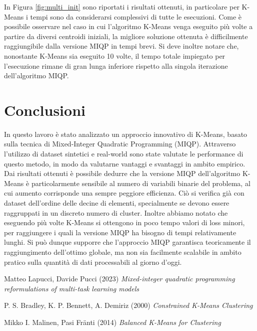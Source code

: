 \documentclass{article}
\begin{document}
    In Figura \ref{fig:multi_init} sono riportati i risultati ottenuti, in particolare per K-Means i tempi sono da considerarsi complessivi di tutte le esecuzioni. Come è possibile osservare nel caso in cui l'algoritmo K-Means venga eseguito più volte a partire da diversi centroidi iniziali, la migliore soluzione ottenuta è difficilmente raggiungibile dalla versione MIQP in tempi brevi. Si deve inoltre notare che, nonostante K-Means sia eseguito 10 volte, il tempo totale impiegato per l'esecuzione rimane di gran lunga inferiore rispetto alla singola iterazione dell'algoritmo MIQP.

    \section{Conclusioni}
    In questo lavoro è stato analizzato un approccio innovativo di K-Means, basato sulla tecnica di Mixed-Integer Quadratic Programming (MIQP). Attraverso l'utilizzo di dataset sintetici e real-world sono state valutate le performance di questo metodo, in modo da valutarne vantaggi e svantaggi in ambito empirico.\\
    Dai risultati ottenuti è possibile dedurre che la versione MIQP dell'algoritmo K-Means è particolarmente sensibile al numero di variabili binarie del problema, al cui aumento corrisponde una sempre peggiore efficienza. Ciò si verifica già con dataset dell'ordine delle decine di elementi, specialmente se devono essere raggruppati in un discreto numero di cluster.
    Inoltre abbiamo notato che eseguendo più volte K-Means si ottengono in poco tempo valori di loss minori, per raggiungere i quali la versione MIQP ha bisogno di tempi relativamente lunghi.
    Si può dunque supporre che l'approccio MIQP garantisca teoricamente il raggiungimento dell'ottimo globale, ma non sia facilmente scalabile in ambito pratico sulla quantità di dati processabili al giorno d'oggi.


    \begin{thebibliography}{9}
Matteo Lapucci, Davide Pucci (2023) \emph{Mixed-integer quadratic programming reformulations of multi-task learning models}

P. S. Bradley, K. P. Bennett, A. Demiriz (2000) \emph{Constrained K-Means Clustering}

Mikko I. Malinen, Pasi Fränti (2014) \emph{Balanced K-Means for Clustering}

\end{thebibliography}
\end{document}
